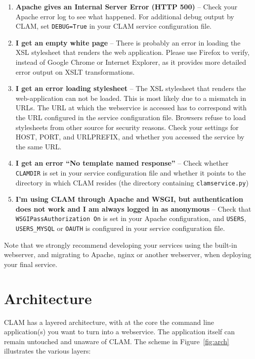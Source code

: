 \documentclass[a4paper,12pt]{report}
\begin{document}
\begin{enumerate}
\item \textbf{Apache gives an Internal Server Error (HTTP 500)} -- Check your Apache error log to see what happened. For additional debug output by CLAM, set \texttt{DEBUG=True} in your CLAM service configuration file. 
\item \textbf{I get an empty white page} -- There is probably an error in loading the XSL stylesheet that renders the web application. Please use Firefox to verify, instead of Google Chrome or Internet Explorer, as it provides more detailed error output on XSLT transformations.
\item \textbf{I get an error loading stylesheet} -- The XSL stylesheet that renders the web-application can not be loaded. This is most likely due to a mismatch in URLs. The URL at which the webservice is accessed has to correspond with the URL configured in the service configuration file. Browsers refuse to load stylesheets from other source for security reasons. Check your settings for HOST, PORT,  and URLPREFIX, and whether you accessed the service by the same URL.
\item \textbf{I get an error ``No template named response''} -- Check whether
  \texttt{CLAMDIR} is set in your service configuration file and whether it points to the directory in which CLAM resides (the directory containing \texttt{clamservice.py})
\item \textbf{I'm using CLAM through Apache and WSGI, but authentication does
  not work and I am always logged in as anonymous} -- Check that
  \texttt{WSGIPassAuthorization On} is set in your Apache configuration, and
  \texttt{USERS}, \texttt{USERS\_MYSQL} or \texttt{OAUTH} is configured in your service configuration file.

\end{enumerate}

Note that we strongly recommend developing your services using the built-in
webserver, and migrating to Apache, nginx or another webserver, when deploying
your final service.

\section{Architecture}

CLAM has a layered architecture, with at the core the command line application(s) you
want to turn into a webservice. The application itself can remain untouched and
unaware of CLAM. The scheme in Figure~\ref{fig:arch} illustrates the various
layers:
\end{document}
